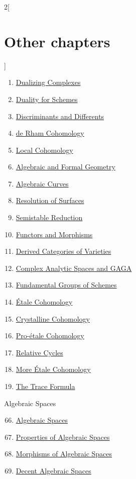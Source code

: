 \begin{multicols}{2}[\section{Other chapters}]
\begin{enumerate}
\item \hyperref[dualizing-section-phantom]{Dualizing Complexes}
\item \hyperref[duality-section-phantom]{Duality for Schemes}
\item \hyperref[discriminant-section-phantom]{Discriminants and Differents}
\item \hyperref[derham-section-phantom]{de Rham Cohomology}
\item \hyperref[local-cohomology-section-phantom]{Local Cohomology}
\item \hyperref[algebraization-section-phantom]{Algebraic and Formal Geometry}
\item \hyperref[curves-section-phantom]{Algebraic Curves}
\item \hyperref[resolve-section-phantom]{Resolution of Surfaces}
\item \hyperref[models-section-phantom]{Semistable Reduction}
\item \hyperref[functors-section-phantom]{Functors and Morphisms}
\item \hyperref[equiv-section-phantom]{Derived Categories of Varieties}
\item \hyperref[gaga-section-phantom]{Complex Analytic Spaces and GAGA}
\item \hyperref[pione-section-phantom]{Fundamental Groups of Schemes}
\item \hyperref[etale-cohomology-section-phantom]{\'Etale Cohomology}
\item \hyperref[crystalline-section-phantom]{Crystalline Cohomology}
\item \hyperref[proetale-section-phantom]{Pro-\'etale Cohomology}
\item \hyperref[relative-cycles-section-phantom]{Relative Cycles}
\item \hyperref[more-etale-section-phantom]{More \'Etale Cohomology}
\item \hyperref[trace-section-phantom]{The Trace Formula}
\end{enumerate}
Algebraic Spaces
\begin{enumerate}
\setcounter{enumi}{65}
\item \hyperref[spaces-section-phantom]{Algebraic Spaces}
\item \hyperref[spaces-properties-section-phantom]{Properties of Algebraic Spaces}
\item \hyperref[spaces-morphisms-section-phantom]{Morphisms of Algebraic Spaces}
\item \hyperref[decent-spaces-section-phantom]{Decent Algebraic Spaces}

\end{enumerate}
\end{multicols}
